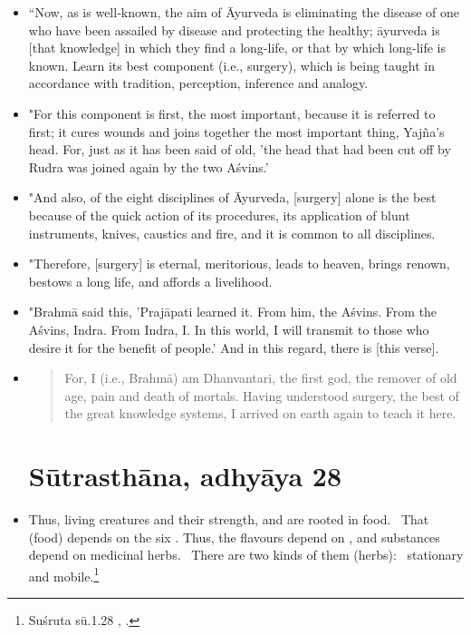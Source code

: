 \documentclass[12pt]{article}
\begin{document}
\begin{itemize}
        \item[22] “Now, as is well-known, the aim of Āyurveda is eliminating the disease of one who have been assailed by disease and protecting the healthy;  āyurveda is [that knowledge] in which they find a long-life, or that by which long-life is known. Learn its best component (i.e., surgery), which is being taught in accordance with tradition, perception, inference and analogy.
        
        \item[23] "For this component is first, the most important, because it is referred to first; it cures wounds and joins together the most important thing, Yajña's head. For, just as it has been said of old, 'the head that had been cut off by Rudra was joined again by the two Aśvins.'
        
        \item[24] "And also, of the eight disciplines of Āyurveda, [surgery] alone is the best because of the quick action of its procedures, its application of blunt instruments, knives, caustics and fire, and it is common to all disciplines.
        
        \item[25] "Therefore, [surgery] is eternal, meritorious, leads to heaven, brings renown, bestows a long life, and affords a livelihood.
        
        \item[26] "Brahmā said this, 'Prajāpati learned it. From him, the Aśvins. From the Aśvins, 
        Indra. From Indra, I. In this world, I will transmit to those who desire it for the benefit of 
        people.' And in this regard, there is [this verse].
        
        \item[27] \begin{quote}
            For, I (i.e., Brahmā) am Dhanvantari, the first god, the remover of old age, pain and 
            death of mortals. Having understood surgery, the best of the great knowledge 
            systems, I arrived on earth again to teach it here.
        \end{quote}    
    
    

  
    \newpage

\section{Sūtrasthāna, adhyāya 28}
    
    \item [1] Thus, living creatures and their strength,
 and  are rooted in food.  That
(food) depends on the six . Thus, the flavours depend
on , and substances depend on medicinal herbs. 
There are two kinds of them (herbs):  stationary and mobile.\footnote{Suśruta
sū.1.28 \cite[I, 21]{shar-susr}, \cite[7]{susr-trikamji2004}.}
\end{itemize}
\end{document}
